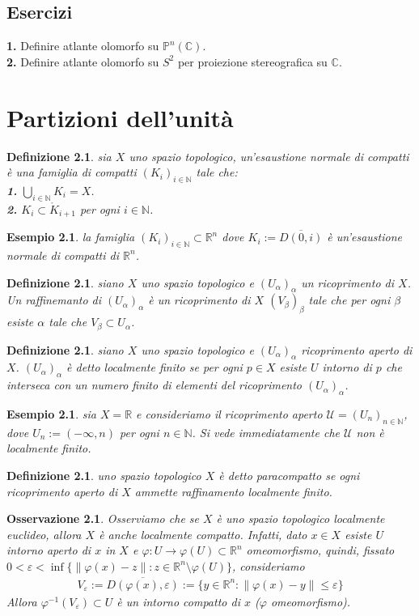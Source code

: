 \documentclass[oneside, 11pt]{amsbook}
\newcommand{\U}{\mathcal{U}}
\newcommand{\R}{\mathbb{R}}
\newcommand{\cC}{\mathbb{C}}
\newcommand{\vp}{\varphi}
\newcommand{\co}[1]{\textit{#1}}
\newcommand{\gr}[1]{\textbf{#1}}
\newcommand{\N}{{\mathbb N}}
\newcommand{\0}{{(0)}}
\newcommand{\3}{{(3)}}
\newcommand{\e}{{\varepsilon}}
\theoremstyle{colonplain}
\theoremstyle{colondefinition}
\newtheorem{defn}[thm]{Definizione}
\newtheorem{ex}[thm]{Esempio}
\theoremstyle{colonremark}
\newtheorem{rmk}[thm]{Osservazione}
\numberwithin{equation}{chapter}
\begin{document}
\section{Esercizi}
\gr{1.} Definire atlante olomorfo su $\mathbb{P}^n(\cC)$. \\

\gr{2.} Definire atlante olomorfo su $S^2$ per proiezione stereografica su $\cC$.

\chapter{Partizioni dell'unità}
\begin{defn}
    sia $X$ uno spazio topologico, un'\co{esaustione normale di compatti} è una famiglia di compatti $(K_i)_{i \in \N}$ tale che: \\
    \gr{1.} $\bigcup_{i \in \N} K_i = X$. \\
    \gr{2.} $K_i \subset \mathring{K}_{i + 1}$ per ogni $i \in \N$.
\end{defn}
\begin{ex}
    la famiglia $(K_i)_{i \in \N} \subset \R^n$ dove $K_i := \overline{D(0, i)}$ è un'esaustione normale di compatti di $\R^n$.
\end{ex}
\begin{defn}
    siano $X$ uno spazio topologico e $(U_\alpha)_\alpha$ un ricoprimento di $X$. Un \co{raffinemanto} di $(U_\alpha)_\alpha$ è un ricoprimento di $X$ $(V_\beta)_\beta$ tale che per ogni $\beta$ esiste $\alpha$ tale che $V_\beta \subset U_\alpha$.
\end{defn}
\begin{defn}
    siano $X$ uno spazio topologico e $(U_\alpha)_\alpha$ ricoprimento aperto di $X$. $(U_\alpha)_\alpha$ è detto \co{localmente finito} se per ogni $p \in X$ esiste $U$ intorno di $p$ che interseca con un numero finito di elementi del ricoprimento $(U_\alpha)_\alpha$.
\end{defn}
\begin{ex}
    sia $X = \R$ e consideriamo il ricoprimento aperto $\U = (U_n)_{n \in \N}$, dove $U_n := (-\infty, n)$ per ogni $n \in \N$. Si vede immediatamente che $\U$ non è localmente finito.
\end{ex}
\begin{defn}
    uno spazio topologico $X$ è detto \co{paracompatto} se ogni ricoprimento aperto di $X$ ammette raffinamento localmente finito.
\end{defn}
\begin{rmk}
    Osserviamo che se $X$ è uno spazio topologico localmente euclideo, allora $X$ è anche localmente compatto. Infatti, dato $x \in X$ esiste $U$ intorno aperto di $x$ in $X$ e $\vp : U \longrightarrow \vp(U) \subset \R^n$ omeomorfismo, quindi, fissato $0 < \e < \inf \{\|\vp(x) - z\| : z \in \R^n \setminus \vp(U)\}$, consideriamo
    \begin{align}
        V_\e := \overline{D(\vp(x), \e)} := \{y \in \R^n : \|\vp(x) - y\| \leq \e\}
    \end{align}
    Allora $\vp^{-1}(V_\e) \subset U$ è un intorno compatto di $x$ ($\vp$ omeomorfismo).
\end{rmk}
\end{document}
